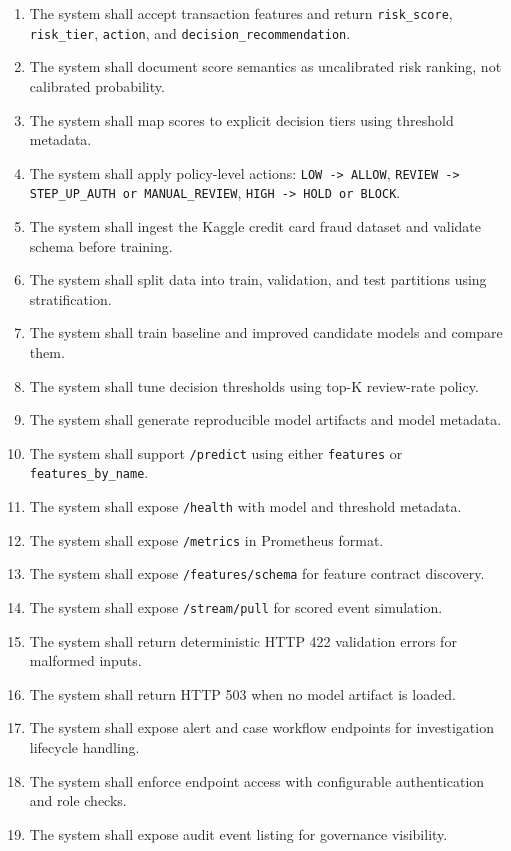 \documentclass[11pt]{article}
\newcommand{\code}[1]{\texttt{#1}}
\begin{document}
\begin{enumerate}[label=FR-\arabic*:, leftmargin=3.2em]
  \item The system shall accept transaction features and return \code{risk_score}, \code{risk_tier}, \code{action}, and \code{decision_recommendation}.
  \item The system shall document score semantics as uncalibrated risk ranking, not calibrated probability.
  \item The system shall map scores to explicit decision tiers using threshold metadata.
  \item The system shall apply policy-level actions: \code{LOW -> ALLOW}, \code{REVIEW -> STEP_UP_AUTH or MANUAL_REVIEW}, \code{HIGH -> HOLD or BLOCK}.
  \item The system shall ingest the Kaggle credit card fraud dataset and validate schema before training.
  \item The system shall split data into train, validation, and test partitions using stratification.
  \item The system shall train baseline and improved candidate models and compare them.
  \item The system shall tune decision thresholds using top-K review-rate policy.
  \item The system shall generate reproducible model artifacts and model metadata.
  \item The system shall support \code{/predict} using either \code{features} or \code{features_by_name}.
  \item The system shall expose \code{/health} with model and threshold metadata.
  \item The system shall expose \code{/metrics} in Prometheus format.
  \item The system shall expose \code{/features/schema} for feature contract discovery.
  \item The system shall expose \code{/stream/pull} for scored event simulation.
  \item The system shall return deterministic HTTP 422 validation errors for malformed inputs.
  \item The system shall return HTTP 503 when no model artifact is loaded.
  \item The system shall expose alert and case workflow endpoints for investigation lifecycle handling.
  \item The system shall enforce endpoint access with configurable authentication and role checks.
  \item The system shall expose audit event listing for governance visibility.

\end{enumerate}
\end{document}
